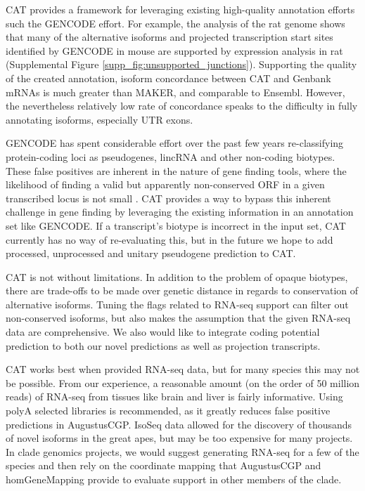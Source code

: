 \documentclass[fleqn,10pt]{wlscirep}
\begin{document}
CAT provides a framework for leveraging existing high-quality annotation efforts such the GENCODE effort. For example, the analysis of the rat genome shows that many of the alternative isoforms and projected transcription start sites identified by GENCODE in mouse are supported by expression analysis in rat (Supplemental Figure \ref{supp_fig:unsupported_junctions}). Supporting the quality of the created annotation, isoform concordance between CAT and Genbank mRNAs is much greater than MAKER, and comparable to Ensembl. However, the nevertheless relatively low rate of concordance speaks to the difficulty in fully annotating isoforms, especially UTR exons. 

GENCODE has spent considerable effort over the past few years re-classifying protein-coding loci as pseudogenes, lincRNA and other non-coding biotypes. These false positives are inherent in the nature of gene finding tools, where the likelihood of finding a valid but apparently non-conserved ORF in a given transcribed locus is not small \cite{lin2011phylocsf}. CAT provides a way to bypass this inherent challenge in gene finding by leveraging the existing information in an annotation set like GENCODE. If a transcript’s biotype is incorrect in the input set, CAT currently has no way of re-evaluating this, but in the future we hope to add processed, unprocessed and unitary pseudogene prediction to CAT.

CAT is not without limitations. In addition to the problem of opaque biotypes, there are trade-offs to be made over genetic distance in regards to conservation of alternative isoforms. Tuning the flags related to RNA-seq support can filter out non-conserved isoforms, but also makes the assumption that the given RNA-seq data are comprehensive. We also would like to integrate coding potential prediction\cite{lin2011phylocsf} to both our novel predictions as well as projection transcripts. 

CAT works best when provided RNA-seq data, but for many species this may not be possible. From our experience, a reasonable amount (on the order of 50 million reads) of RNA-seq from tissues like brain and liver is fairly informative. Using polyA selected libraries is recommended, as it greatly reduces false positive predictions in AugustusCGP. IsoSeq data allowed for the discovery of thousands of novel isoforms in the great apes, but may be too expensive for many projects. In clade genomics projects, we would suggest generating RNA-seq for a few of the species and then rely on the coordinate mapping that AugustusCGP and homGeneMapping provide to evaluate support in other members of the clade.
\end{document}
